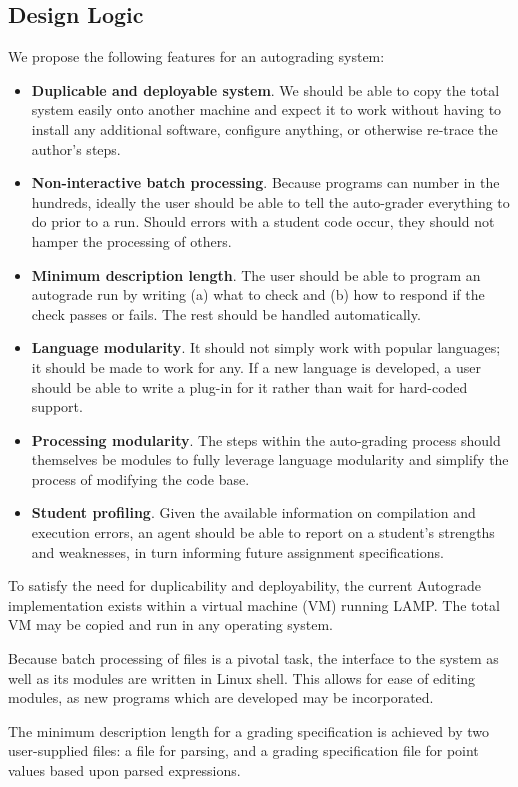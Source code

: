 \subsection{Design Logic}


We propose the following features for an autograding system:

\begin{itemize}

  \item \textbf{Duplicable and deployable system}. We should be able to copy
    the total system easily onto another machine and expect it to work without
    having to install any additional software, configure anything, or otherwise
    re-trace the author's steps.

  \item \textbf{Non-interactive batch processing}. Because programs can number
    in the hundreds, ideally the user should be able to tell the auto-grader
    everything to do prior to a run. Should errors with a student code occur,
    they should not hamper the processing of others.
    
  \item \textbf{Minimum description length}. The user should be able to program
    an autograde run by writing (a) what to check and (b) how to respond if the
    check passes or fails. The rest should be handled automatically.

  \item \textbf{Language modularity}. It should not simply work with popular
    languages; it should be made to work for any.  If a new language is
    developed, a user should be able to write a plug-in for it rather than
    wait for hard-coded support.

  \item \textbf{Processing modularity}. The steps within the auto-grading
    process should themselves be modules to fully leverage language modularity
    and simplify the process of modifying the code base.

  \item \textbf{Student profiling}. Given the available information on
    compilation and execution errors, an agent should be able to report
    on a student's strengths and weaknesses, in turn informing future
    assignment specifications.

\end{itemize}

To satisfy the need for duplicability and deployability, the current Autograde
implementation exists within a virtual machine (VM) running LAMP.  The total
VM may be copied and run in any operating system.

Because batch processing of files is a pivotal task, the interface to the
system as well as its modules are written in Linux shell.  This allows for ease
of editing modules, as new programs which are developed may be incorporated.

The minimum description length for a grading specification is achieved by two
user-supplied files: a file for parsing, and a grading specification file for
point values based upon parsed expressions.


